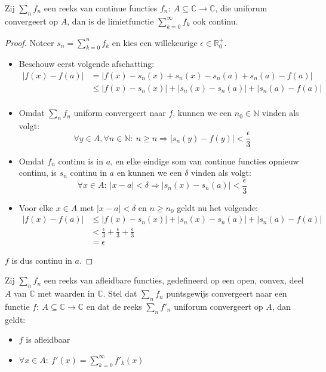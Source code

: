 \documentclass[main.tex]{subfiles}
\begin{document}
\begin{bpr}
  Zij $\sum_{n}f_{n}$ een reeks van continue functies $f_{n}:\ A \subseteq \mathbb{C} \rightarrow \mathbb{C}$, die uniforum convergeert op $A$, dan is de limietfunctie $\sum_{k=0}^{\infty}f_{k}$ ook continu.

  \begin{proof}
    Noteer $s_{n} = \sum_{k=0}^{n}f_{k}$ en kies een willekeurige $\epsilon \in \mathbb{R}_{0}^{+}$.
    \begin{itemize}
    \item Beschouw eerst volgende afschatting:
      \[
      \begin{array}{rl}
        |f(x)-f(a)| &= |f(x) - s_{n}(x) + s_{n}(x) - s_{n}(a) + s_{n}(a) - f(a)|\\
        &\le |f(x) - s_{n}(x)| + |s_{n}(x) - s_{n}(a)| + |s_{n}(a) - f(a)|\\
      \end{array}
      \]
    \item Omdat $\sum_{n}f_{n}$ uniform convergeert naar $f$, kunnen we een $n_{0}\in \mathbb{N}$ vinden als volgt:
      \[ \forall y \in A, \forall n\in \mathbb{N}:\ n\ge n \Rightarrow |s_{n}(y)-f(y)|<\frac{\epsilon}{3} \]
    \item Omdat $f_{n}$ continu is in $a$, en elke eindige som van continue functies opnieuw continu\waarom, is $s_{n}$ continu in $a$ en kunnen we een $\delta$ vinden als volgt:
      \[ \forall x\in A:\ |x-a| <\delta \Rightarrow |s_{n}(x) - s_{n}(a)| < \frac{\epsilon}{3} \]
    \item 
      Voor elke $x\in A$ met $|x-a|<\delta$ en $n\ge n_{0}$ geldt nu het volgende:
      \[
      \begin{array}{rl}
        |f(x)-f(a)| &\le |f(x) - s_{n}(x)| + |s_{n}(x) - s_{n}(a)| + |s_{n}(a) - f(a)|\\
        &< \frac{\epsilon}{3} + \frac{\epsilon}{3} + \frac{\epsilon}{3}\\
        &= \epsilon
      \end{array}
      \]
    \end{itemize}
    $f$ is dus continu in $a$.
\feed
  \end{proof}
\end{bpr}

\begin{bpr}
  Zij $\sum_{n}f_{n}$ een reeks van afleidbare functies, gedefineerd op een open, convex, deel $A$ van $\mathbb{C}$ met waarden in $\mathbb{C}$.
  Stel dat $\sum_{n}f_{n}$ puntsgewijs convergeert naar een functie $f:\ A\subseteq \mathbb{C} \rightarrow \mathbb{C}$ en dat de reeks $\sum_{n}f'_{n}$ uniforum convergeert op $A$, dan geldt:
  \begin{itemize}
  \item $f$ is afleidbaar
  \item $\forall x\in A:\ f'(x) = \sum_{k=0}^{\infty}f'_{k}(x)$
  \end{itemize}
\end{bpr}
\end{document}
